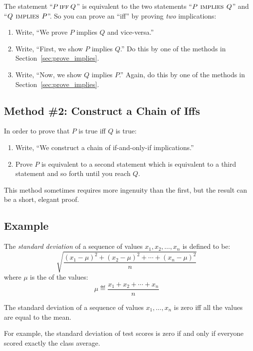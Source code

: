The statement ``$P \mathbin{\mathrm{\textsc{iff}}} Q$'' is equivalent to the two statements ``$P
\mathbin{\mathrm{\textsc{\,implies\,}}} Q$'' and ``$Q \mathbin{\mathrm{\textsc{\,implies\,}}} P$''.  So you can prove an ``iff'' by
proving \textit{two} implications:
%
\begin{enumerate}
\item Write, ``We prove $P$ implies $Q$ and vice-versa.''
\item Write, ``First, we show $P$ implies $Q$.'' Do this by one
of the methods in Section~\ref{sec:prove_implies}.
\item Write, ``Now, we show $Q$ implies $P$.''  Again, do this by
one of the methods in Section~\ref{sec:prove_implies}.
\end{enumerate}

\subsection{Method \#2:  Construct a Chain of Iffs}
In order to prove that $P$ is true iff $Q$ is true:
%
\begin{enumerate}
\item Write, ``We construct a chain of if-and-only-if implications.''
\item Prove $P$ is equivalent to a second statement which is
equivalent to a third statement and so forth until you reach $Q$.
\end{enumerate}
%
This method sometimes requires more ingenuity than the first, but the
result can be a short, elegant proof.

\subsection*{Example}
The \textit{standard deviation} of a sequence of values $x_1, x_2,
\dots, x_n$ is defined to be:
%
\begin{equation}\label{sd}
\sqrt{\frac{(x_1 - \mu)^2 + (x_2 - \mu)^2 + \cdots + (x_n - \mu)^2}{n}}
\end{equation}
%
where $\mu$ is the  of the values:
%
\[
\mu \eqdef \frac{x_1 + x_2 + \cdots + x_n}{n}
\]

\begin{theorem}
The standard deviation of a sequence of values $x_1, \dots, x_n$ is
zero iff all the values are equal to the mean.
\end{theorem}

For example, the standard deviation of test scores is zero if and only
if everyone scored exactly the class average.

